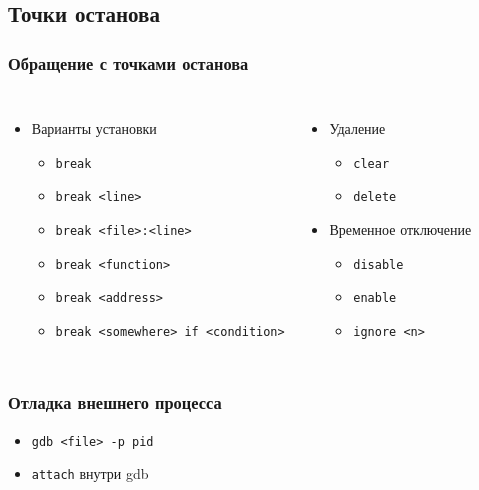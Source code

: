 \subsection[breakpoints]{Точки останова}
\begin{frame}
 \frametitle{Обращение с точками останова}
 \begin{columns}
 \begin{itemize}
   \item{Варианты установки}
   \begin{itemize}
     \item \texttt{break}
     \item \texttt{break <line>}
     \item \texttt{break <file>:<line>}
     \item \texttt{break <function>}
     \item \texttt{break <address>}
     \item \texttt{break <somewhere> if <condition>}
   \end{itemize}
\end{itemize}
  \begin{itemize}   
    \item Удаление
     \begin{itemize}
       \item \texttt{clear} 
       \item \texttt{delete}
     \end{itemize}
     \item Временное отключение
     \begin{itemize}
       \item \texttt{disable}
       \item \texttt{enable}
       \item \texttt{ignore <n>}
     \end{itemize}
  \end{itemize}
\end{columns}
\end{frame}

\begin{frame}
 \frametitle{Отладка внешнего процесса}
 \begin{itemize}
   \item \texttt{gdb <file> -p pid}
   \item \texttt{attach} внутри gdb 
 \end{itemize} 
\end{frame}

